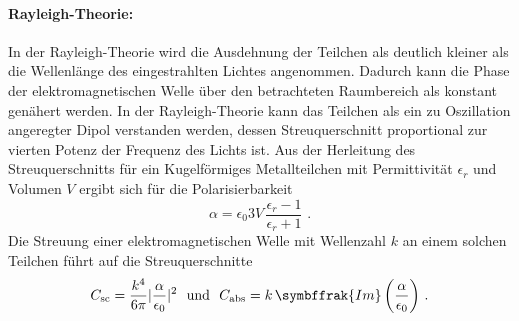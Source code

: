 \paragraph{Rayleigh-Theorie:}
In der Rayleigh-Theorie wird die Ausdehnung der Teilchen als deutlich kleiner als die Wellenlänge des eingestrahlten Lichtes angenommen. Dadurch kann die Phase der elektromagnetischen Welle über den betrachteten Raumbereich als konstant genähert werden. In der Rayleigh-Theorie kann das Teilchen als ein zu Oszillation angeregter Dipol verstanden werden, dessen Streuquerschnitt proportional zur vierten Potenz der Frequenz des Lichts ist. Aus der Herleitung des Streuquerschnitts für ein Kugelförmiges Metallteilchen mit Permittivität $\epsilon_r$  und Volumen $V$ ergibt sich für die Polarisierbarkeit
\begin{equation}
  \alpha = \epsilon_0 3 V\, \frac{\epsilon_r-1}{\epsilon_r+1}\,\,.
  \label{eqn:polbarkeit}
\end{equation}
Die Streuung einer elektromagnetischen Welle mit Wellenzahl $k$ an einem solchen Teilchen führt auf die Streuquerschnitte
\begin{equation}
  C_{\text{sc}} = \frac{k^4}{6\pi}|\frac{\alpha}{\epsilon_0}|^2 \,\,\,\, \text{und}\,\,\,\, C_{\text{abs}} = k\, \symbffrak{Im}\left(\frac{\alpha}{\epsilon_0}\right)\,.
  \label{eqn:rayleigh}
\end{equation}

